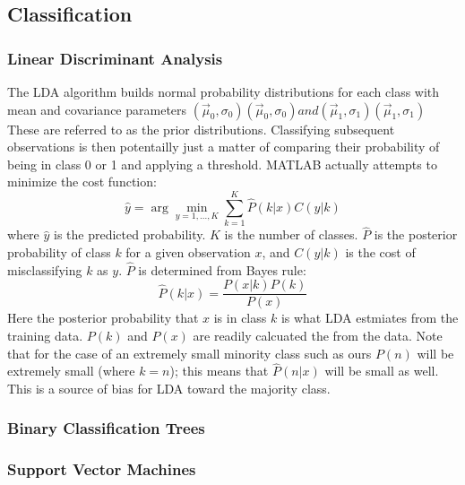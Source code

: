 \documentclass{article}
\begin{document}
\subsection{Classification}
\subsubsection{Linear Discriminant Analysis}
The LDA algorithm builds normal probability distributions for each class with mean and covariance parameters $\left({\vec {\mu }}_{0}, \sigma_{0} \right) \left({\vec {\mu }}_{0}, \sigma_{0}\right) and \left({\vec {\mu }}_{1},\sigma_{1}\right) \left({\vec {\mu }}_{1}, \sigma_{1}\right)$
These are referred to as the prior distributions. Classifying subsequent observations is then potentailly just a matter of comparing their probability of being in class 0 or 1 and applying a threshold.
MATLAB actually attempts to minimize the cost function:
\begin{equation}
\hat{y}=\arg\min_{y=1,...,K}\sum_{k=1}^{K}\hat{P}(k|x)C(y|k)
\end{equation}
where $\hat{y}$ is the predicted probability. $K$ is the number of classes. $\hat{P}$ is the posterior probability of class $k$ for a given observation $x$, and $C(y|k)$ is the cost of misclassifying $k$ as $y$.
$\hat{P}$ is determined from Bayes rule:
\begin{equation}
\hat{P}(k|x)=\frac{P(x|k)P(k)}{P(x)}
\end{equation}
Here the posterior probability that $x$ is in class $k$ is what LDA estmiates from the training data.
$P(k)$ and $P(x)$ are readily calcuated the from the data.
Note that for the case of an extremely small minority class such as ours $P(n)$ will be extremely small (where $k=n$); this means that $\hat{P}(n|x)$ will be small as well.
This is a source of bias for LDA toward the majority class.

\subsubsection{Binary Classification Trees}

\subsubsection{Support Vector Machines}
\end{document}
